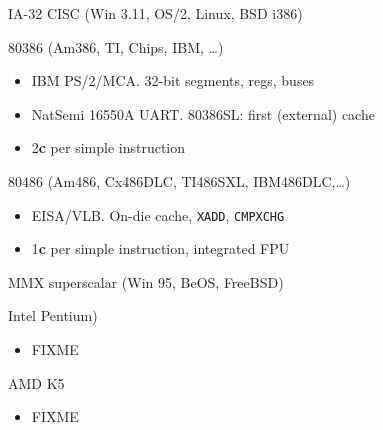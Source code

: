 \documentclass[xcolor={dvipsnames,table}]{beamer}
\begin{document}
\begin{frame}[t]{IA-32 CISC (Win 3.11, OS/2, Linux, BSD i386)}
\begin{block}{80386 (Am386, TI, Chips, IBM, \ldots)}
\begin{itemize}
\item IBM PS/2/MCA. 32-bit segments, regs, buses
\item NatSemi 16550A UART. 80386SL: first (external) cache
\item 2\textbf{c} per simple instruction
\end{itemize}
\end{block}
\begin{block}{80486 (Am486, Cx486DLC, TI486SXL, IBM486DLC,\ldots)}
\begin{itemize}
\item EISA/VLB. On-die cache, \texttt{XADD}, \texttt{CMPXCHG}
\item 1\textbf{c} per simple instruction, integrated FPU
\end{itemize}
\end{block}
\vfill
\begin{center}
\end{center}
\end{frame}

\begin{frame}[t]{MMX superscalar (Win 95, BeOS, FreeBSD)}
\begin{block}{Intel Pentium)}
\begin{itemize}
\item FIXME
\end{itemize}
\end{block}
\begin{block}{AMD K5}
\begin{itemize}
\item FIXME
\end{itemize}
\end{block}
\vfill

\end{frame}
\end{document}

